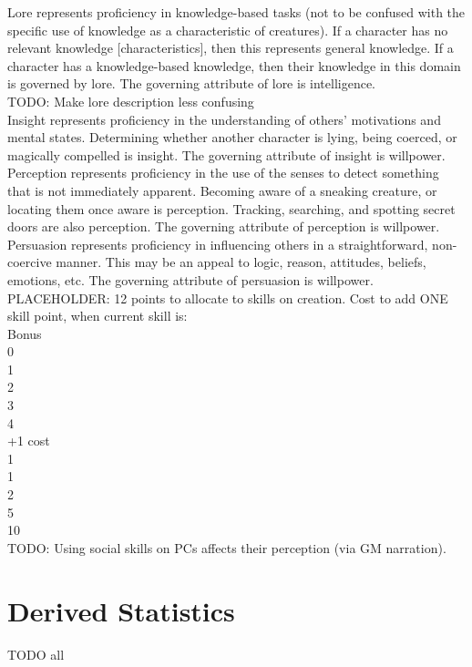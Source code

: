\documentclass[letterpaper,titlepage,openany,twocolumn]{book}
\begin{document}
Lore represents proficiency in knowledge-based tasks (not to be confused with the specific use of knowledge as a characteristic of creatures). If a character has no relevant knowledge [characteristics], then this represents general knowledge. If a character has a knowledge-based knowledge, then their knowledge in this domain is governed by lore. The governing attribute of lore is intelligence.\\
TODO: Make lore description less confusing\\

Insight represents proficiency in the understanding of others’ motivations and mental states. Determining whether another character is lying, being coerced, or magically compelled is insight. The governing attribute of insight is willpower.\\

Perception represents proficiency in the use of the senses to detect something that is not immediately apparent. Becoming aware of a sneaking creature, or locating them once aware is perception. Tracking, searching, and spotting secret doors are also perception. The governing attribute of perception is willpower.\\

Persuasion represents proficiency in influencing others in a straightforward, non-coercive manner. This may be an appeal to logic, reason, attitudes, beliefs, emotions, etc. The governing attribute of persuasion is willpower.\\

PLACEHOLDER: 12 points to allocate to skills on creation. Cost to add ONE skill point, when current skill is:\\
Bonus\\
0\\
1\\
2\\
3\\
4\\
+1 cost\\
1\\
1\\
2\\
5\\
10\\
TODO: Using social skills on PCs affects their perception (via GM narration).\\

\section{Derived Statistics}
TODO all\\
\end{document}
